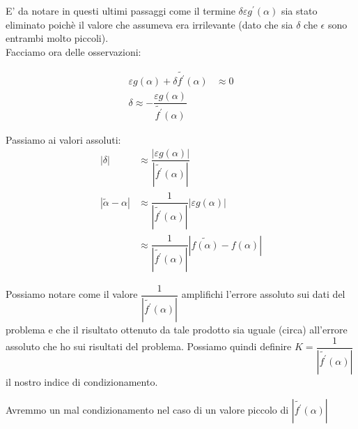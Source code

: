 \documentclass[12pt, a4paper]{book}
\theoremstyle{definition}
\begin{document}
\begin{flushleft}
 E' da notare in questi ultimi passaggi come il termine $\delta \varepsilon g^{'}(\alpha)$ sia stato eliminato poichè il valore che assumeva era irrilevante (dato che sia $\delta$ che $\epsilon$ sono entrambi molto piccoli). \\
Facciamo ora delle osservazioni:

\begin{equation}
	\begin{split}
		 \varepsilon g(\alpha) + \delta \tilde{f^{'}}(\alpha) & \approx 0 \\
		 \delta \approx - \dfrac{\varepsilon g(\alpha)}{ \tilde{f^{'}}(\alpha)}
	\end{split}
\end{equation}


Passiamo ai valori assoluti:
\begin{equation}
	\begin{split}
		 | \delta | & \approx   \dfrac{| \varepsilon g(\alpha) |}{ | \tilde{f^{'}}(\alpha)| } \\
		 | \tilde{\alpha} - \alpha | & \approx \dfrac{1}{| \tilde{f^{'}}(\alpha)|} |\varepsilon g(\alpha)| \\
		 & \approx \dfrac{1}{| \tilde{f^{'}}(\alpha)|} | \tilde{f(\alpha)} - f(\alpha) |
	\end{split}
\end{equation}

Possiamo notare come il valore $\dfrac{1}{| \tilde{f^{'}}(\alpha)|}$ amplifichi l'errore assoluto sui dati del problema e che il risultato ottenuto da tale prodotto sia uguale (circa) all'errore assoluto che ho sui risultati del problema. Possiamo quindi definire $K = \dfrac{1}{| \tilde{f^{'}}(\alpha)|}$ il nostro indice di condizionamento.\\
\vspace{1em}

Avremmo un mal condizionamento nel caso di un valore piccolo di $|\tilde{f^{'}}(\alpha)|$
\end{flushleft}
\end{document}
